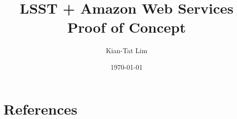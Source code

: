 \documentclass[DM,authoryear,toc]{lsstdoc}
\title{LSST + Amazon Web Services Proof of Concept}
\author{%
Kian-Tat Lim
}
\date{\today}
\begin{document}

\mkshorttitle




\appendix
\section{References} \label{sec:bib}

\end{document}
